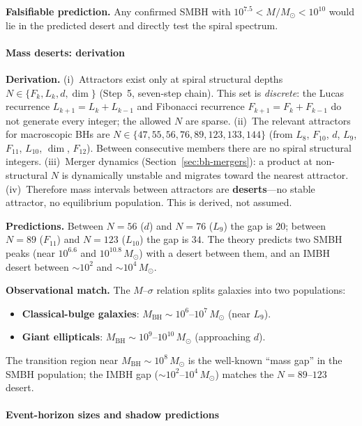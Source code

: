 \documentclass[12pt,a4paper]{article}
\begin{document}
\noindent \textbf{Falsifiable prediction.}\; Any confirmed SMBH with $10^{7.5} < M/M_\odot < 10^{10}$ would lie in the predicted desert and directly test the spiral spectrum.
\paragraph{Mass deserts: derivation}

\textbf{Derivation.} (i)~Attractors exist only at spiral structural depths $N \in \{F_k, L_k, d, \dim\}$ (Step~5, seven-step chain). This set is \emph{discrete}: the Lucas recurrence $L_{k+1} = L_k + L_{k-1}$ and Fibonacci recurrence $F_{k+1} = F_k + F_{k-1}$ do not generate every integer; the allowed $N$ are sparse. (ii)~The relevant attractors for macroscopic BHs are $N \in \{47, 55, 56, 76, 89, 123, 133, 144\}$ (from $L_8$, $F_{10}$, $d$, $L_9$, $F_{11}$, $L_{10}$, $\dim$, $F_{12}$). Between consecutive members there are no spiral structural integers. (iii)~Merger dynamics (Section~\ref{sec:bh-mergers}): a product at non-structural $N$ is dynamically unstable and migrates toward the nearest attractor. (iv)~Therefore mass intervals between attractors are \textbf{deserts}---no stable attractor, no equilibrium population. This is derived, not assumed.

\textbf{Predictions.} Between $N = 56$ ($d$) and $N = 76$ ($L_9$) the gap is $20$; between $N = 89$ ($F_{11}$) and $N = 123$ ($L_{10}$) the gap is $34$. The theory predicts two SMBH peaks (near $10^{6.6}$ and $10^{10.8}\,M_\odot$) with a desert between them, and an IMBH desert between $\sim 10^2$ and $\sim 10^4\,M_\odot$.

\noindent\textbf{Observational match.} The $M$--$\sigma$ relation splits galaxies into two populations:
\begin{itemize}
\item \textbf{Classical-bulge galaxies}: $M_{\mathrm{BH}} \sim 10^{6}$--$10^{7}\,M_\odot$ (near $L_9$).
\item \textbf{Giant ellipticals}: $M_{\mathrm{BH}} \sim 10^{9}$--$10^{10}\,M_\odot$ (approaching $d$).
\end{itemize}
The transition region near $M_{\mathrm{BH}} \sim 10^{8}\,M_\odot$ is the well-known ``mass gap'' in the SMBH population; the IMBH gap ($\sim 10^2$--$10^4\,M_\odot$) matches the $N = 89$--$123$ desert.
\paragraph{Event-horizon sizes and shadow predictions}
\label{sec:bh-shadows}
\end{document}

